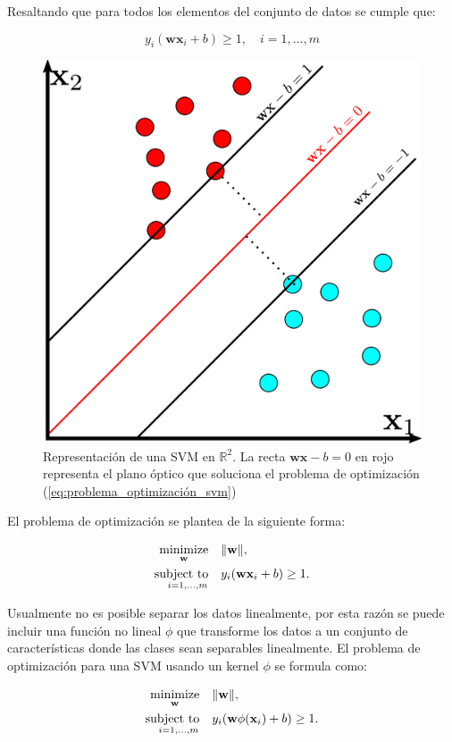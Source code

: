 Resaltando que para todos los elementos del conjunto de datos se cumple que:

\begin{equation}
    y_i(\mathbf{w}\mathbf{x}_i + b) \geq 1, \quad i=1,\dots, m
\end{equation}

\begin{figure}[H]
    \centering
    \includegraphics[width=0.4\linewidth]{images/svm.pdf}
    \caption{Representación de una SVM en $\mathbb{R}^2$. La recta $\mathbf{wx} -b = 0$ en rojo representa el plano óptico que soluciona el problema de optimización (\ref{eq:problema_optimización_svm})}
    \label{fig:svm}
\end{figure}
El problema de optimización se plantea de la siguiente forma:

\begin{equation}
    \begin{aligned}
        \operatorname*{minimize}_{\mathbf{w}} & \quad \Vert \mathbf{w} \Vert, \\
        \operatorname*{subject \ to}_{\quad i=1,\dots, m} & \quad y_i(\mathbf{w}\mathbf{x}_i + b) \geq 1.
    \end{aligned}
    \label{eq:problema_optimización_svm}
\end{equation}

Usualmente no es posible separar los datos linealmente, por esta razón se puede incluir una función no lineal $ \phi$ que transforme los datos a un conjunto de características donde las clases sean separables linealmente. El problema de optimización para una SVM usando un kernel $\phi$ se formula como:

\begin{equation}
    \begin{aligned}
        \operatorname*{minimize}_{\mathbf{w}} & \quad \Vert \mathbf{w} \Vert, \\
        \operatorname*{subject \ to}_{\quad i=1,\dots, m} & \quad y_i(\mathbf{w}\phi(\mathbf{x}_i) + b) \geq 1.
    \end{aligned}
\end{equation}


